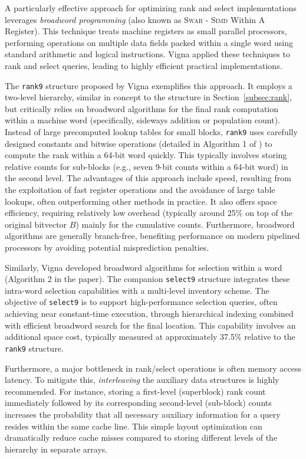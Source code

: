 A particularly effective approach for optimizing \textsf{rank} and \textsf{select} implementations leverages \emph{broadword programming} (also known as \textsc{Swar} - \textsc{Simd} Within A Register). This technique treats machine registers as small parallel processors, performing operations on multiple data fields packed within a single word using standard arithmetic and logical instructions. Vigna \cite{vigna2008broadword} applied these techniques to \textsf{rank} and \textsf{select} queries, leading to highly efficient practical implementations.

The \texttt{rank9} structure proposed by Vigna \cite{vigna2008broadword} exemplifies this approach. It employs a two-level hierarchy, similar in concept to the structure in Section~\ref{subsec:rank}, but critically relies on broadword algorithms for the final \textsf{rank} computation within a machine word (specifically, sideways addition or population count). Instead of large precomputed lookup tables for small blocks, \texttt{rank9} uses carefully designed constants and bitwise operations (detailed in Algorithm 1 of \cite{vigna2008broadword}) to compute the rank within a 64-bit word quickly. This typically involves storing relative counts for sub-blocks (e.g., seven 9-bit counts within a 64-bit word) in the second level. The advantages of this approach include speed, resulting from the exploitation of fast register operations and the avoidance of large table lookups, often outperforming other methods in practice. It also offers space efficiency, requiring relatively low overhead (typically around 25\% on top of the original bitvector $B$) mainly for the cumulative counts. Furthermore, broadword algorithms are generally branch-free, benefiting performance on modern pipelined processors by avoiding potential misprediction penalties.

Similarly, Vigna \cite{vigna2008broadword} developed broadword algorithms for selection within a word (Algorithm 2 in the paper). The companion \texttt{select9} structure integrates these intra-word selection capabilities with a multi-level inventory scheme. The objective of \texttt{select9} is to support high-performance selection queries, often achieving near constant-time execution, through hierarchical indexing combined with efficient broadword search for the final location. This capability involves an additional space cost, typically measured at approximately 37.5\% relative to the \texttt{rank9} structure.

Furthermore, a major bottleneck in \textsf{rank}/\textsf{select} operations is often memory access latency. To mitigate this, \emph{interleaving} the auxiliary data structures is highly recommended. For instance, storing a first-level (superblock) rank count immediately followed by its corresponding second-level (sub-block) counts increases the probability that all necessary auxiliary information for a query resides within the same cache line. This simple layout optimization can dramatically reduce cache misses compared to storing different levels of the hierarchy in separate arrays.
